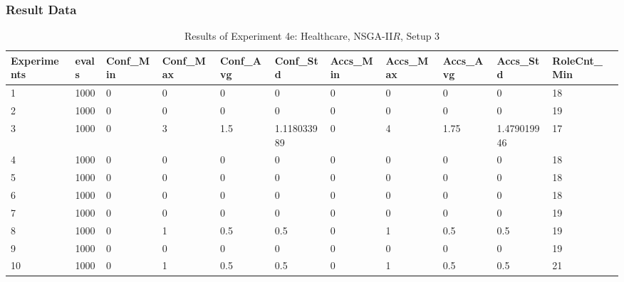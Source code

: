 	\subsubsection{Result Data}
	\label{sec:A_Exp4e_Data}
	\begin{table}[H]
		\caption{Results of Experiment 4e: Healthcare, NSGA-II$R$, Setup 3}
		\label{tab:A_Exp4e_Data}
		\begin{adjustbox}{max width=380pt,keepaspectratio,angle=90}
			\begin{tabular}{|l|l|l|l|l|l|l|l|l|l|l|}
				\hline
				\rowcolor[HTML]{EFEFEF} 
				Experiments & evals & Conf\_Min & Conf\_Max & Conf\_Avg & Conf\_Std   & Accs\_Min & Accs\_Max & Accs\_Avg & Accs\_Std   & RoleCnt\_Min \\ \hline
				1           & 1000  & 0         & 0         & 0         & 0           & 0         & 0         & 0         & 0           & 18           \\ \hline
				2           & 1000  & 0         & 0         & 0         & 0           & 0         & 0         & 0         & 0           & 19           \\ \hline
				3           & 1000  & 0         & 3         & 1.5       & 1.118033989 & 0         & 4         & 1.75      & 1.479019946 & 17           \\ \hline
				4           & 1000  & 0         & 0         & 0         & 0           & 0         & 0         & 0         & 0           & 18           \\ \hline
				5           & 1000  & 0         & 0         & 0         & 0           & 0         & 0         & 0         & 0           & 18           \\ \hline
				6           & 1000  & 0         & 0         & 0         & 0           & 0         & 0         & 0         & 0           & 18           \\ \hline
				7           & 1000  & 0         & 0         & 0         & 0           & 0         & 0         & 0         & 0           & 19           \\ \hline
				8           & 1000  & 0         & 1         & 0.5       & 0.5         & 0         & 1         & 0.5       & 0.5         & 19           \\ \hline
				9           & 1000  & 0         & 0         & 0         & 0           & 0         & 0         & 0         & 0           & 19           \\ \hline
				10          & 1000  & 0         & 1         & 0.5       & 0.5         & 0         & 1         & 0.5       & 0.5         & 21           \\ \hline

\end{tabular}
\end{adjustbox}
\end{table}
